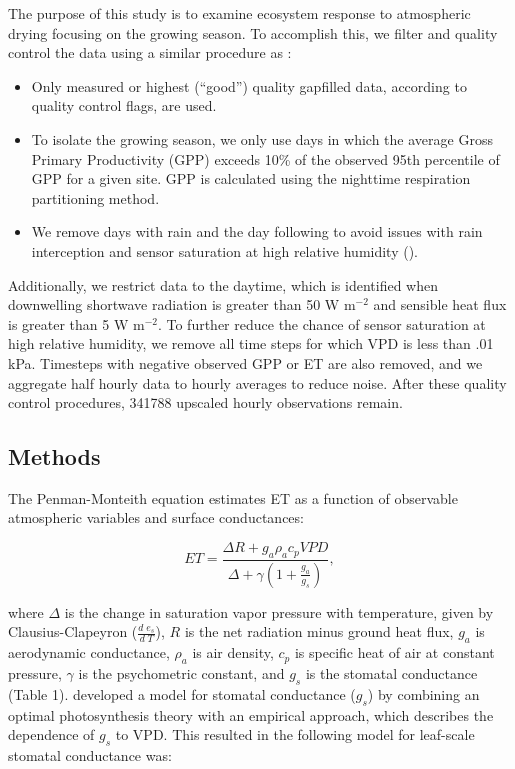 \documentclass[draft,linenumbers]{gcbjournal}
\begin{document}
The purpose of this study is to examine ecosystem response to atmospheric drying focusing on the growing season. To accomplish this, we filter and quality control the data using a similar procedure as \cite{Zhou_2015}:
\begin{itemize}
\item Only measured or highest (``good'') quality gapfilled data, according to quality control flags, are used.
\item To isolate the growing season, we only use days in which the average Gross Primary Productivity (GPP) exceeds 10\% of the observed 95th percentile of GPP for a given site. GPP is calculated using the nighttime respiration partitioning method.
\item We remove days with rain and the day following to avoid issues with rain interception and sensor saturation at high relative humidity (\cite{MEDLYN_2011}).
\end{itemize}
Additionally, we restrict data to the daytime, which is identified when downwelling shortwave radiation is greater than 50 W m$^{-2}$ and sensible heat flux is greater than 5 W m$^{-2}$. To further reduce the chance of sensor saturation at high relative humidity, we remove all time steps for which VPD is less than .01 kPa. Timesteps with negative observed GPP or ET are also removed, and we aggregate half hourly data to hourly averages to reduce noise. After these quality control procedures, 341788 upscaled hourly observations remain. 

\subsection{Methods}
\label{methods}
The Penman-Monteith equation \citep [hereafter PM,][]{Monteith_1965} estimates ET as a function of observable atmospheric variables and surface conductances:
\begin{linenomath*}
  \begin{equation}
    \label{orig_pen}
    ET = \frac{\Delta R + g_a \rho_a c_p VPD}{\Delta + \gamma(1 + \frac{g_a}{g_s})},
  \end{equation}
\end{linenomath*}
where $\Delta$ is the change in saturation vapor pressure with temperature, given by Clausius-Clapeyron ($\frac{d \; e_s}{d \; T}$), $R$ is the net radiation minus ground heat flux, $g_a$ is aerodynamic conductance, $\rho_a$ is air density, $c_p$ is specific heat of air at constant pressure, $\gamma$ is the psychometric constant, and $g_s$ is the stomatal conductance (Table 1). \citet{MEDLYN_2011} developed a model for stomatal conductance ($g_s$) by combining an optimal photosynthesis theory \citep{Farquhar_1980, Katul_2010} with an empirical approach, which describes the dependence of $g_s$ to VPD. This resulted in the following model for leaf-scale stomatal conductance was:
\end{document}
